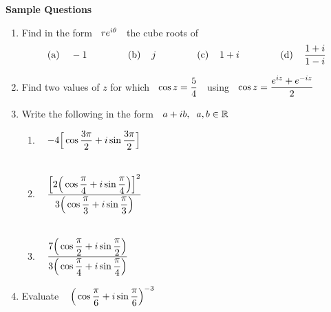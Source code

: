 \documentclass[11pt,a4paper]{article}
\begin{document}
\pagebreak
\textbf{Sample Questions}
\begin{enumerate}
\item Find in the form $\hspace{0.2cm} re^{i\theta}\hspace{0.2cm}$ the cube roots of 
$$(\text{a})\hspace{0.4cm} - 1\hspace{1.5cm}  (\text{b})\hspace{0.4cm} j    \hspace{1.5cm} (\text{c})\hspace{0.4cm}  1 + i \hspace{1.5cm}  (\text{d})\hspace{0.4cm} \dfrac{1 + i}{1 - i}$$

\item Find two values of $z$ for which $\hspace{0.2cm} \cos z = \dfrac{5}{4}\hspace{0.2cm}$ using $\hspace{0.2cm} \cos z = \dfrac{e^{iz} + e^{-iz}}{2}$\\

\item Write the following in the form $\hspace{0.2cm} a + ib, \hspace{0.2cm} a, b \in \mathbb{R}$
\begin{enumerate}
      \item $\hspace{0.3cm}\displaystyle{ - 4\Big[ \cos \dfrac{3\pi}{2} + i\sin \dfrac{3\pi}{2}\Big]}$\\\\
      
      \item $\hspace{0.3cm}\displaystyle{\dfrac{\Big[2\Big(\cos \dfrac{\pi}{4} + i \sin \dfrac{\pi}{4}\Big)\Big]^2}{3\Big( \cos \dfrac{\pi}{3} + i \sin \dfrac{\pi}{3}\Big)}}$\\\\
      
      \item $\hspace{0.3cm} \displaystyle{\dfrac{7\Big(\cos \dfrac{\pi}{2} + i \sin \dfrac{\pi}{2}\Big)}{3\Big(\cos \dfrac{\pi}{4} + i\sin \dfrac{\pi}{4}\Big)}}$\\
\end{enumerate}


\item Evaluate $\hspace{0.3cm} \displaystyle{\Big( \cos \dfrac{\pi}{6} + i \sin \dfrac{\pi}{6}\Big)^{-3}}$\\


\end{enumerate}
\end{document}
